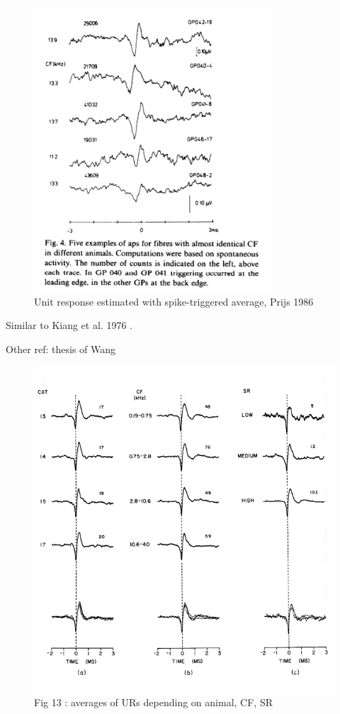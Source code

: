 \documentclass[]{article}
\begin{document}
\begin{figure}
\centering
\includegraphics[width=3.50000in]{./figures/unit_response.png}
\caption{Unit response estimated with spike-triggered average, Prijs
1986 \citep{Prijs1986}}
\end{figure}

Similar to Kiang et al. 1976 \citep{Kiang1976}.

Other ref: thesis of Wang \citep{Wang1979}

\begin{figure}
\centering
\includegraphics[width=5.50000in]{./figures/URs.png}
\caption{Fig 13 \citep{Wang1979} : averages of URs depending on animal,
CF, SR}
\end{figure}
\end{document}
